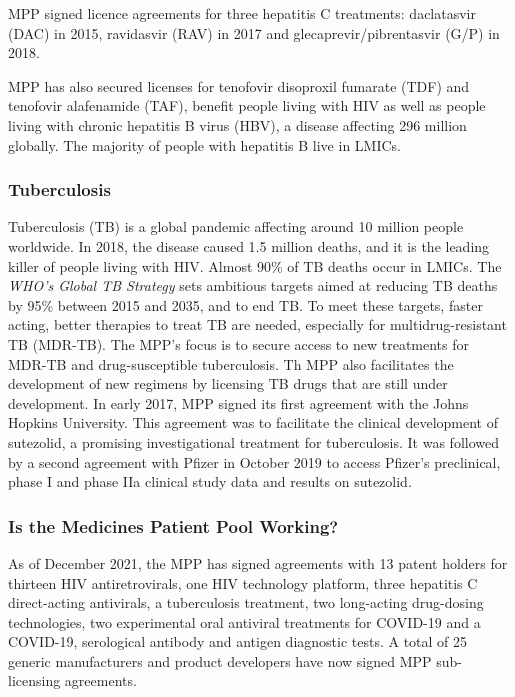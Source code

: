 \documentclass[
  11pt,
  paper=a4,
  ,captions=tableheading
]{scrartcl}
\begin{document}
MPP signed licence agreements for three hepatitis C treatments:
daclatasvir (DAC) in 2015, ravidasvir (RAV) in 2017 and
glecaprevir/pibrentasvir (G/P) in 2018.

MPP has also secured licenses for tenofovir disoproxil fumarate (TDF)
and tenofovir alafenamide (TAF), benefit people living with HIV as well
as people living with chronic hepatitis B virus (HBV), a disease
affecting 296 million globally. The majority of people with hepatitis B
live in LMICs.

\hypertarget{tuberculosis}{%
\subsubsection*{Tuberculosis}\label{tuberculosis}}

Tuberculosis (TB) is a global pandemic affecting around 10 million
people worldwide. In 2018, the disease caused 1.5 million deaths, and it
is the leading killer of people living with HIV. Almost 90\% of TB
deaths occur in LMICs. The \emph{WHO's Global TB Strategy} sets
ambitious targets aimed at reducing TB deaths by 95\% between 2015 and
2035, and to end TB. To meet these targets, faster acting, better
therapies to treat TB are needed, especially for multidrug-resistant TB
(MDR-TB). The MPP's focus is to secure access to new treatments for
MDR-TB and drug-susceptible tuberculosis. Th MPP also facilitates the
development of new regimens by licensing TB drugs that are still under
development. In early 2017, MPP signed its first agreement with the
Johns Hopkins University. This agreement was to facilitate the clinical
development of sutezolid, a promising investigational treatment for
tuberculosis. It was followed by a second agreement with Pfizer in
October 2019 to access Pfizer's preclinical, phase I and phase IIa
clinical study data and results on sutezolid.

\hypertarget{is-the-medicines-patient-pool-working}{%
\subsubsection*{Is the Medicines Patient Pool
Working?}\label{is-the-medicines-patient-pool-working}}

As of December 2021, the MPP has signed agreements with 13 patent
holders for thirteen HIV antiretrovirals, one HIV technology platform,
three hepatitis C direct-acting antivirals, a tuberculosis treatment,
two long-acting drug-dosing technologies, two experimental oral
antiviral treatments for COVID-19 and a COVID-19, serological antibody
and antigen diagnostic tests. A total of 25 generic manufacturers and
product developers have now signed MPP sub-licensing agreements.
\end{document}
